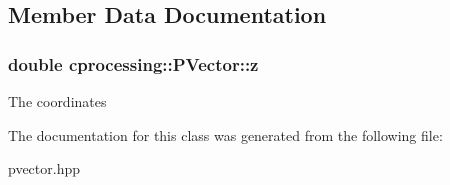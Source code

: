 \subsection{\-Member \-Data \-Documentation}
\hypertarget{classcprocessing_1_1PVector_a28310efbe3ee03e9d5c01e5869428f70}{
\subsubsection[{z}]{\setlength{\rightskip}{0pt plus 5cm}double {\bf cprocessing\-::\-P\-Vector\-::z}}}\label{classcprocessing_1_1PVector_a28310efbe3ee03e9d5c01e5869428f70}
\-The coordinates 

\-The documentation for this class was generated from the following file\-:\begin{DoxyCompactItemize}
\item 
pvector.\-hpp\end{DoxyCompactItemize}
